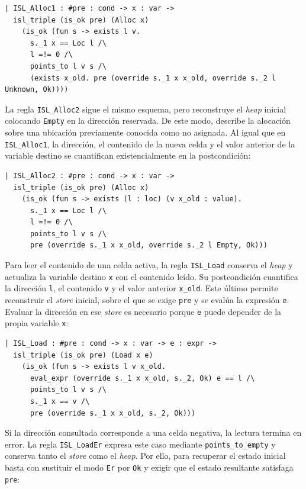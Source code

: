 \documentclass[a4paper,	11pt]{report}
\begin{document}
\begin{lstlisting}
| ISL_Alloc1 : #pre : cond -> x : var ->
  isl_triple (is_ok pre) (Alloc x)
    (is_ok (fun s -> exists l v.
      s._1 x == Loc l /\
      l =!= 0 /\
      points_to l v s /\
      (exists x_old. pre (override s._1 x x_old, override s._2 l Unknown, Ok))))
\end{lstlisting}

La regla \lstinline|ISL_Alloc2| sigue el mismo esquema,
pero reconstruye el \emph{heap} inicial colocando \lstinline|Empty| en la dirección reservada.
De este modo,
describe la alocación sobre una ubicación previamente conocida como no asignada.
Al igual que en \lstinline|ISL_Alloc1|,
la dirección,
el contenido de la nueva celda y el valor anterior de la variable destino se cuantifican existencialmente en la postcondición:

\begin{lstlisting}
| ISL_Alloc2 : #pre : cond -> x : var ->
  isl_triple (is_ok pre) (Alloc x)
    (is_ok (fun s -> exists (l : loc) (v x_old : value).
      s._1 x == Loc l /\
      l =!= 0 /\
      points_to l v s /\
      pre (override s._1 x x_old, override s._2 l Empty, Ok)))
\end{lstlisting}

Para leer el contenido de una celda activa,
la regla \lstinline|ISL_Load| conserva el \emph{heap} y actualiza la variable destino \lstinline|x| con el contenido leído.
Su postcondición cuantifica la dirección \lstinline|l|,
el contenido \lstinline|v| y el valor anterior \lstinline|x_old|.
Este último permite reconstruir el \emph{store} inicial,
sobre el que se exige \lstinline|pre| y se evalúa la expresión \lstinline|e|.
Evaluar la dirección en ese \emph{store} es necesario porque \lstinline|e| puede depender de la propia variable \lstinline|x|:

\begin{lstlisting}
| ISL_Load : #pre : cond -> x : var -> e : expr ->
  isl_triple (is_ok pre) (Load x e)
    (is_ok (fun s -> exists l v x_old.
      eval_expr (override s._1 x x_old, s._2, Ok) e == l /\
      points_to l v s /\
      s._1 x == v /\
      pre (override s._1 x x_old, s._2, Ok)))
\end{lstlisting}

Si la dirección consultada corresponde a una celda negativa,
la lectura termina en error.
La regla \lstinline|ISL_LoadEr| expresa este caso mediante \lstinline|points_to_empty|
y conserva tanto el \emph{store} como el \emph{heap}.
Por ello,
para recuperar el estado inicial basta con sustituir el modo \lstinline|Er| por \lstinline|Ok|
y exigir que el estado resultante satisfaga \lstinline|pre|:
\end{document}
